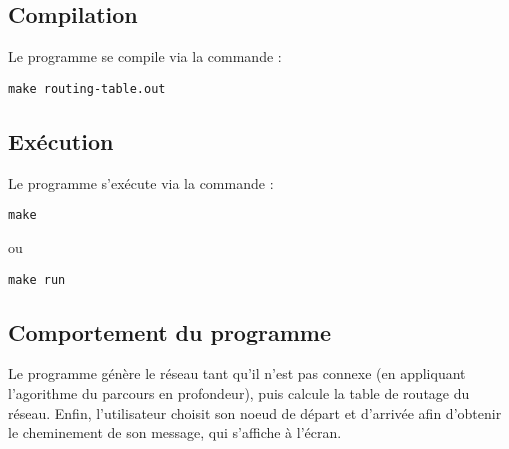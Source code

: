 \documentclass{article}
\begin{document}
\subsection{Compilation}
Le programme se compile via la commande :
\begin{verbatim}
make routing-table.out
\end{verbatim}

\subsection{Exécution}
Le programme s'exécute via la commande :
\begin{verbatim}
make
\end{verbatim}
ou
\begin{verbatim}
make run
\end{verbatim}

\subsection{Comportement du programme}
Le programme génère le réseau tant qu'il n'est pas connexe (en appliquant l'agorithme du parcours en profondeur), puis calcule la table de routage du réseau. Enfin, l'utilisateur choisit son noeud de départ et d'arrivée afin d'obtenir le cheminement de son message, qui s'affiche à l'écran.
\end{document}
